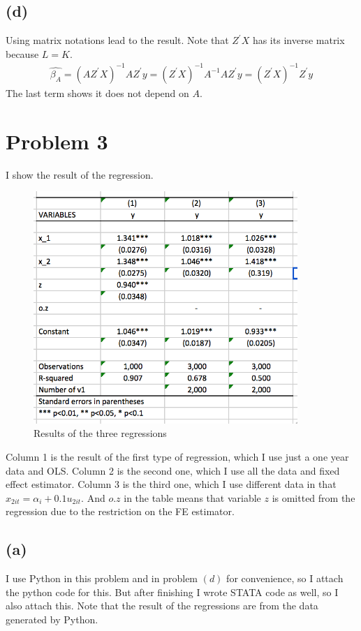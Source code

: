 \documentclass{article}
\begin{document}
\subsection{(d)}
Using matrix notations lead to the result. Note that $Z^{'}X$ has its inverse matrix because $L = K$.
\begin{align*}
	\hat{\beta_A} = (AZ^{'}X)^{-1}AZ^{'}y = (Z^{'}X)^{-1}A^{-1}AZ^{'}y = (Z^{'}X)^{-1}Z^{'}y
\end{align*}
The last term shows it does not depend on $A$.

\section{Problem 3}
I show the result of the regression.
\begin{figure}[h]
    \centering
    \includegraphics[width=10cm]{3.png}
    \caption{Results of the three regressions}
\end{figure}
Column 1 is the result of the first type of regression, which I use just a one year data and OLS. Column 2 is the second one, which I use all the data and fixed effect estimator. Column 3 is the third one, which I use different data in that $x_{2it} = \alpha_i + 0.1u_{2it}$. And $o.z$ in the table means that variable $z$ is omitted from the regression due to the restriction on the FE estimator.
\subsection{(a)}
I use Python in this problem and in problem $(d)$ for convenience, so I attach the python code for this. But after finishing I wrote STATA code as well, so I also attach this. Note that the result of the regressions are from the data generated by Python.

\end{document}

